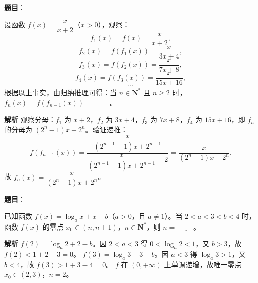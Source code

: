\begin{answer}

\textbf{题目}：

设函数 $f(x)=\dfrac{x}{x+2}$（$x>0$），观察：
\nopagebreak[4]
\[f_1(x)=f(x)=\frac{x}{x+2},\]
\nopagebreak[4]
\[f_2(x)=f(f_1(x))=\frac{x}{3x+4},\]
\nopagebreak[4]
\[f_3(x)=f(f_2(x))=\frac{x}{7x+8},\]
\nopagebreak[4]
\[f_4(x)=f(f_3(x))=\frac{x}{15x+16},\]
\nopagebreak[4]
\[\cdots\]
根据以上事实，由归纳推理可得：当 $n\in\mathbf N^*$ 且 $n\geqslant2$ 时，$f_n(x)=f(f_{n-1}(x))=$ $\underline{\qquad}$。

\textbf{解析}
观察分母：$f_1$ 为 $x+2$，$f_2$ 为 $3x+4$，$f_3$ 为 $7x+8$，$f_4$ 为 $15x+16$，即 $f_n$ 的分母为 $(2^n-1)x+2^n$。验证递推：
\nopagebreak[4]
\[f(f_{n-1}(x))=\frac{\dfrac{x}{(2^{n-1}-1)x+2^{n-1}}}{\dfrac{x}{(2^{n-1}-1)x+2^{n-1}}+2}
=\frac{x}{(2^n-1)x+2^n}.\]
故 $f_n(x)=\dfrac{x}{(2^n-1)x+2^n}$。


\end{answer}
\begin{answer}

\textbf{题目}：

已知函数 $f(x)=\log_ax+x-b$（$a>0$，且 $a\neq1$）。当 $2<a<3<b<4$ 时，函数 $f(x)$ 的零点 $x_0\in(n,n+1)$，$n\in\mathbf N^*$，则 $n=$ $\underline{\qquad}$。

\textbf{解析}
$f(2)=\log_a2+2-b$。因 $2<a<3$ 得 $0<\log_a2<1$，又 $b>3$，故 $f(2)<1+2-3=0$。
$f(3)=\log_a3+3-b$。因 $a<3$ 得 $\log_a3>1$，又 $b<4$，故 $f(3)>1+3-4=0$。
$f$ 在 $(0,+\infty)$ 上单调递增，故唯一零点 $x_0\in(2,3)$，$n=2$。


\end{answer}
